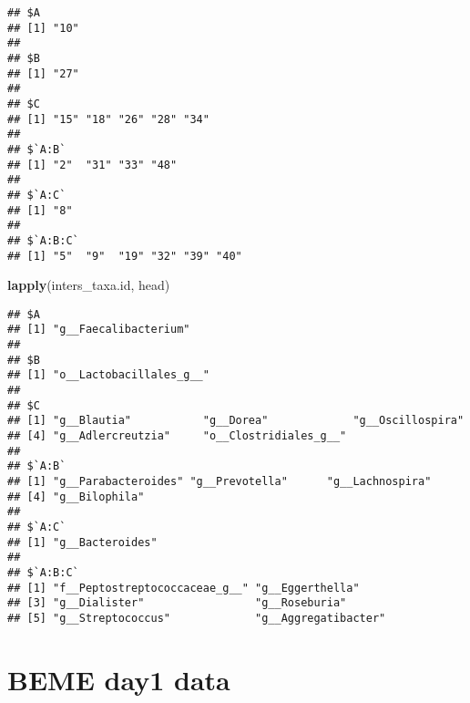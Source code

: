 \documentclass[]{book}
\newenvironment{Shaded}{\begin{snugshade}}{\end{snugshade}}
\newcommand{\KeywordTok}[1]{\textcolor[rgb]{0.13,0.29,0.53}{\textbf{#1}}}
\newcommand{\NormalTok}[1]{#1}
\begin{document}
\begin{verbatim}
## $A
## [1] "10"
## 
## $B
## [1] "27"
## 
## $C
## [1] "15" "18" "26" "28" "34"
## 
## $`A:B`
## [1] "2"  "31" "33" "48"
## 
## $`A:C`
## [1] "8"
## 
## $`A:B:C`
## [1] "5"  "9"  "19" "32" "39" "40"
\end{verbatim}

\begin{Shaded}
\begin{Highlighting}[]
\KeywordTok{lapply}\NormalTok{(inters_taxa.id, head) }
\end{Highlighting}
\end{Shaded}

\begin{verbatim}
## $A
## [1] "g__Faecalibacterium"
## 
## $B
## [1] "o__Lactobacillales_g__"
## 
## $C
## [1] "g__Blautia"           "g__Dorea"             "g__Oscillospira"     
## [4] "g__Adlercreutzia"     "o__Clostridiales_g__"
## 
## $`A:B`
## [1] "g__Parabacteroides" "g__Prevotella"      "g__Lachnospira"    
## [4] "g__Bilophila"      
## 
## $`A:C`
## [1] "g__Bacteroides"
## 
## $`A:B:C`
## [1] "f__Peptostreptococcaceae_g__" "g__Eggerthella"              
## [3] "g__Dialister"                 "g__Roseburia"                
## [5] "g__Streptococcus"             "g__Aggregatibacter"
\end{verbatim}

\section{BEME day1 data}\label{beme-day1-data-4}


\end{document}
